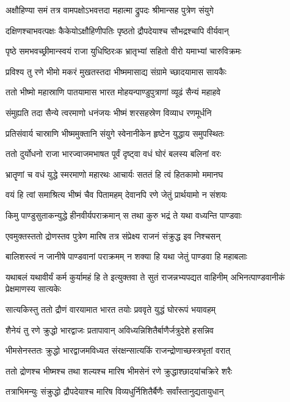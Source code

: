 \twolineshloka
{अक्षौहिण्या समं तत्र वामपक्षोऽभवत्तदा}
{महात्मा द्रुपदः श्रीमान्सह पुत्रेण संयुगे}


\twolineshloka
{दक्षिणश्चाभवत्पक्षः कैकेयोऽक्षौहिणीपतिः}
{पृष्ठतो द्रौपदेयाश्च सौभद्रश्चापि वीर्यवान्}


\twolineshloka
{पृष्ठे समभवच्छ्रीमान्स्वयं राजा युधिष्ठिरःक}
{भ्रातृभ्यां सहितो वीरो यमाभ्यां चारुविक्रमः}


\twolineshloka
{प्रविश्य तु रणे भीमो मकरं मुखतस्तदा}
{भीष्ममासाद्य संग्रामे च्छादयामास सायकैः}


\twolineshloka
{ततो भीष्मो महास्राणि पातयामास भारत}
{मोहयन्पाण्डुपुत्राणां व्यूढं सैन्यं महाहवे}


\twolineshloka
{संमुह्यति तदा सैन्ये त्वरमाणो धनंजयः}
{भीष्मं शरसहस्रेण विव्याध रणमूर्धनि}


\twolineshloka
{प्रतिसंवार्य चास्राणि भीष्ममुक्तानि संयुगे}
{स्वेनानीकेन हृष्टेन युद्धाय समुपस्थितः}


\twolineshloka
{ततो दुर्योधनो राजा भारज्वाजमभाषत}
{पूर्वं दृष्ट्वा वधं घोरं बलस्य बलिनां वरः}


\twolineshloka
{भ्रातॄणां च वधं युद्धे स्मरमाणो महारथः}
{आचार्यः सततं हि त्वं हितकामो ममानघ}


\twolineshloka
{वयं हि त्वां समाश्रित्य भीष्मं चैव पितामहम्}
{देवानपि रणे जेतुं प्रार्थयामो न संशयः}


\twolineshloka
{किमु पाण्डुसुताकन्युद्धे हीनवीर्यपराक्रमान्}
{स तथा कुरु भद्रं ते यथा वध्यन्ति पाण्डवाः}


\twolineshloka
{एवमुक्तस्ततो द्रोणस्तव पुत्रेण मारिष}
{तत्र संप्रेक्ष्य राजनं संक्रुद्ध इव निश्चसन्}


\twolineshloka
{बालिशस्त्वं न जानीषे पाण्डवानां पराक्रमम्}
{न शक्या हि यथा जेतुं पाण्डवा हि महाबलाः}


\threelineshloka
{यथाबलं यथावीर्यं कर्म कुर्यामहं हि ते}
{इत्युक्तवा ते सुतं राजन्नभ्यपद्यत वाहिनीम्}
{अभिनत्पाण्डवानीकं प्रेक्षमाणस्य सात्यकेः}


\twolineshloka
{सात्यकिस्तु ततो द्रौणं वारयामात भारत}
{तयोः प्रववृते युद्धं घोररूपं भयावहम्}


\twolineshloka
{शैनेयं तु रणे क्रुद्धो भारद्वाजः प्रतापावान्}
{अविध्यन्निशितैर्बाणैर्जत्रुदेशे हसन्निव}


\twolineshloka
{भीमसेनस्ततः क्रुद्धो भारद्वाजमविध्यत}
{संरक्षन्सात्यकिं राजन्द्रोणाच्छस्त्रभृतां वरात्}


\twolineshloka
{ततो द्रोणश्च भीष्मश्च तथा शल्यश्च मारिष}
{भीमसेनं रणे क्रुद्धाश्छादयांचक्रिरे शरैः}


\twolineshloka
{तत्राभिमन्युः संक्रुद्धो द्रौपदेयाश्च मारिष}
{विव्यधुर्निशितैर्बैणैः सर्वांस्तानुद्यतायुधान्}



